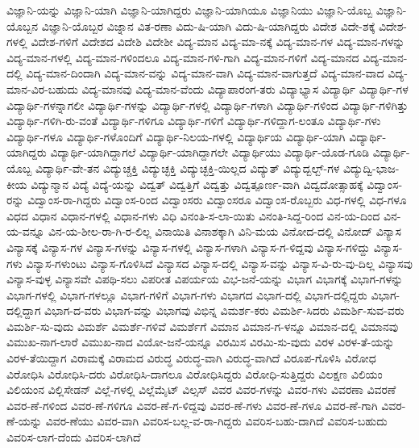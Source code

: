{ವಿಜ್ಞಾನಿ-ಯನ್ನು
ವಿಜ್ಞಾನಿ-ಯಾಗಿ
ವಿಜ್ಞಾನಿ-ಯಾಗಿದ್ದರು
ವಿಜ್ಞಾನಿ-ಯಾಗಿಯೂ
ವಿಜ್ಞಾನಿಯು
ವಿಜ್ಞಾನಿ-ಯೊಬ್ಬ
ವಿಜ್ಞಾನಿ-ಯೊಬ್ಬನ
ವಿಜ್ಞಾನಿ-ಯೊಬ್ಬರ
ವಿಜ್ನಾನ
ವಿತ-ರಣಾ
ವಿದು-ಷಿ-ಯಾಗಿ
ವಿದು-ಷಿ-ಯಾಗಿದ್ದರು
ವಿದೇಶ
ವಿದೇ-ಶಕ್ಕೆ
ವಿದೇಶ-ಗಳಲ್ಲಿ
ವಿದೇಶ-ಗಳಿಗೆ
ವಿದೇಶದ
ವಿದೇಶಿ
ವಿದೇಶೀ
ವಿದ್ಯ-ಮಾನ
ವಿದ್ಯ-ಮಾ-ನಕ್ಕೆ
ವಿದ್ಯ-ಮಾನ-ಗಳ
ವಿದ್ಯ-ಮಾನ-ಗಳನ್ನು
ವಿದ್ಯ-ಮಾನ-ಗಳಲ್ಲಿ
ವಿದ್ಯ-ಮಾನ-ಗಳಿಂದಲೂ
ವಿದ್ಯ-ಮಾನ-ಗಳಿ-ಗಾಗಿ
ವಿದ್ಯ-ಮಾನ-ಗಳಿಗೆ
ವಿದ್ಯ-ಮಾನದ
ವಿದ್ಯ-ಮಾನ-ದಲ್ಲಿ
ವಿದ್ಯ-ಮಾನ-ದಿಂದಾಗಿ
ವಿದ್ಯ-ಮಾನ-ವನ್ನು
ವಿದ್ಯ-ಮಾನ-ವಾಗಿ
ವಿದ್ಯ-ಮಾನ-ವಾಗುತ್ತದೆ
ವಿದ್ಯ-ಮಾನ-ವಾದ
ವಿದ್ಯ-ಮಾನ-ವಿರ-ಬಹುದು
ವಿದ್ಯ-ಮಾನವು
ವಿದ್ಯ-ಮಾನ-ವೆಂದು
ವಿದ್ಯಾಪಾರಂಗ-ತರು
ವಿದ್ಯಾಭ್ಯಾಸ
ವಿದ್ಯಾರ್ಥಿ
ವಿದ್ಯಾರ್ಥಿ-ಗಳ
ವಿದ್ಯಾರ್ಥಿ-ಗಳನ್ನಾಗಲೀ
ವಿದ್ಯಾರ್ಥಿ-ಗಳನ್ನು
ವಿದ್ಯಾರ್ಥಿ-ಗಳಲ್ಲಿ
ವಿದ್ಯಾರ್ಥಿ-ಗಳಾಗಿ
ವಿದ್ಯಾರ್ಥಿ-ಗಳಿಂದ
ವಿದ್ಯಾರ್ಥಿ-ಗಳಿಗಿತ್ತು
ವಿದ್ಯಾರ್ಥಿ-ಗಳಿಗಿ-ರು-ವಂತೆ
ವಿದ್ಯಾರ್ಥಿ-ಗಳಿಗೂ
ವಿದ್ಯಾರ್ಥಿ-ಗಳಿಗೆ
ವಿದ್ಯಾರ್ಥಿ-ಗಳಿದ್ದಾಗ-ಲಂತೂ
ವಿದ್ಯಾರ್ಥಿ-ಗಳು
ವಿದ್ಯಾರ್ಥಿ-ಗಳೂ
ವಿದ್ಯಾರ್ಥಿ-ಗಳೊಂದಿಗೆ
ವಿದ್ಯಾರ್ಥಿ-ನಿಲಯ-ಗಳಲ್ಲಿ
ವಿದ್ಯಾರ್ಥಿಯ
ವಿದ್ಯಾರ್ಥಿ-ಯಾಗಿ
ವಿದ್ಯಾರ್ಥಿ-ಯಾಗಿದ್ದರು
ವಿದ್ಯಾರ್ಥಿ-ಯಾಗಿದ್ದಾಗಲೆ
ವಿದ್ಯಾರ್ಥಿ-ಯಾಗಿದ್ದಾಗಲೇ
ವಿದ್ಯಾರ್ಥಿಯು
ವಿದ್ಯಾರ್ಥಿ-ಯೊಡ-ಗೂಡಿ
ವಿದ್ಯಾರ್ಥಿ-ಯೊಬ್ಬ
ವಿದ್ಯಾರ್ಥಿ-ವೇ-ತನ
ವಿದ್ಯುಚ್ಚಕ್ತಿ
ವಿದ್ಯುಚ್ಛಕ್ತಿ
ವಿದ್ಯುಚ್ಛಕ್ತಿ-ಯಿಲ್ಲದ
ವಿದ್ಯುತ್
ವಿದ್ಯುದ್ಬಲ್ಬ್-ಗಳ
ವಿದ್ಯುದ್ವಿ-ಭಾಜ-ಕೀಯ
ವಿದ್ಯುನ್ಮಾನ
ವಿದ್ಯೆ
ವಿದ್ಯೆ-ಯನ್ನು
ವಿದ್ವತ್
ವಿದ್ವತ್ತಿಗೆ
ವಿದ್ವತ್ತು
ವಿದ್ವತ್ಪೂರ್ಣ-ವಾಗಿ
ವಿದ್ವದೋತ್ಸಾಹಕ್ಕೆ
ವಿದ್ವಾಂಸ-ರನ್ನು
ವಿದ್ವಾಂಸ-ರಾ-ಗಿದ್ದರು
ವಿದ್ವಾಂಸ-ರಿಂದ
ವಿದ್ವಾಂಸರು
ವಿದ್ವಾಂಸರೂ
ವಿದ್ವಾಂಸ-ರೊಬ್ಬರು
ವಿಧ-ಗಳಲ್ಲಿ
ವಿಧ-ಗಳೂ
ವಿಧದ
ವಿಧಾನ
ವಿಧಾನ-ಗಳಲ್ಲಿ
ವಿಧಾನ-ಗಳು
ವಿಧಿ
ವಿನಂತಿ-ಸ-ಲಾ-ಯಿತು
ವಿನಂತಿ-ಸಿದ್ದ-ರಿಂದ
ವಿನ-ಯ-ದಿಂದ
ವಿನ-ಯ-ವನ್ನೂ
ವಿನ-ಯ-ಶೀಲ-ರಾ-ಗಿ-ರ-ಲಿಲ್ಲ
ವಿನಾಯಿತಿ
ವಿನಾಶಕ್ಕಾಗಿ
ವಿನಿ-ಮಯ
ವಿನೋದ-ದಲ್ಲಿ
ವಿನೋದ್
ವಿನ್ಯಾಸ
ವಿನ್ಯಾಸಕ್ಕೆ
ವಿನ್ಯಾಸ-ಗಳ
ವಿನ್ಯಾಸ-ಗಳನ್ನು
ವಿನ್ಯಾಸ-ಗಳಲ್ಲಿ
ವಿನ್ಯಾಸ-ಗಳಾಗಿ
ವಿನ್ಯಾಸ-ಗ-ಳಿದ್ದವು
ವಿನ್ಯಾಸ-ಗಳಿದ್ದು
ವಿನ್ಯಾಸ-ಗಳು
ವಿನ್ಯಾಸ-ಗಳುಂಟು
ವಿನ್ಯಾಸ-ಗೊಳಿಸಿದೆ
ವಿನ್ಯಾಸದ
ವಿನ್ಯಾಸ-ದಲ್ಲಿ
ವಿನ್ಯಾಸ-ವನ್ನು
ವಿನ್ಯಾಸ-ವಿ-ರು-ವು-ದಿಲ್ಲ
ವಿನ್ಯಾಸವು
ವಿನ್ಯಾಸ-ವುಳ್ಳ
ವಿನ್ಯಾಸವೇ
ವಿಪಥಿ-ಸಲು
ವಿಪರೀತ
ವಿಪರ್ಯಯ
ವಿಭ-ಜನೆ-ಯನ್ನು
ವಿಭಾಗ
ವಿಭಾಗಕ್ಕೆ
ವಿಭಾಗ-ಗಳನ್ನು
ವಿಭಾಗ-ಗಳಲ್ಲಿ
ವಿಭಾಗ-ಗಳಲ್ಲೂ
ವಿಭಾಗ-ಗಳಿಗೆ
ವಿಭಾಗ-ಗಳು
ವಿಭಾಗದ
ವಿಭಾಗ-ದಲ್ಲಿ
ವಿಭಾಗ-ದಲ್ಲಿದ್ದರು
ವಿಭಾಗ-ದಲ್ಲಿದ್ದಾಗ
ವಿಭಾಗ-ದ-ವರು
ವಿಭಾಗ-ವನ್ನು
ವಿಭಾಗವು
ವಿಭಿನ್ನ
ವಿಮರ್ಶ-ಕರು
ವಿಮರ್ಶಿ-ಸಿದರು
ವಿಮರ್ಶಿ-ಸುವ-ವರು
ವಿಮರ್ಶಿ-ಸು-ವುದು
ವಿಮರ್ಶೆ
ವಿಮರ್ಶೆ-ಗಳಿವೆ
ವಿಮರ್ಶೆಗೆ
ವಿಮಾನ
ವಿಮಾನ-ಗ-ಳನ್ನೂ
ವಿಮಾನ-ದಲ್ಲಿ
ವಿಮಾನವು
ವಿಮುಖ-ನಾಗ-ಲಾರೆ
ವಿಮುಖ-ನಾದ
ವಿಯೋ-ಜನೆ-ಯನ್ನೂ
ವಿರಮಿಸ
ವಿರಮಿ-ಸು-ವುದು
ವಿರಳ
ವಿರಳ-ತೆ-ಯನ್ನು
ವಿರಳ-ತೆಯಿದ್ದಾಗ
ವಿರಾಮಕ್ಕೆ
ವಿರಾಮದ
ವಿರುದ್ಧ
ವಿರುದ್ಧ-ವಾಗಿ
ವಿರುದ್ಧ-ವಾಗಿದೆ
ವಿರೂಪ-ಗೊಳಿಸಿ
ವಿರೋಧ
ವಿರೋಧಿಸಿ
ವಿರೋಧಿಸಿ-ದರು
ವಿರೋಧಿಸಿ-ದಾಗಲೂ
ವಿರೋಧಿಸಿದ್ದರು
ವಿರೋಧಿ-ಸುತ್ತಿದ್ದರು
ವಿಲಕ್ಷಣ
ವಿಲಿಯಂ
ವಿಲಿಯಂನ
ವಿಲ್ಲಿಸೇಡನ್
ವಿಲ್ಲೆ-ಗಳಲ್ಲಿ
ವಿಲ್ಲೆಮೈಟ್
ವಿಲ್ಸಸ್
ವಿವರ
ವಿವರ-ಗಳನ್ನು
ವಿವರ-ಗಳು
ವಿವರಣಾ
ವಿವರಣೆ
ವಿವರ-ಣೆ-ಗಳಿಂದ
ವಿವರ-ಣೆ-ಗಳಿಗೂ
ವಿವರ-ಣೆ-ಗ-ಳಿದ್ದವು
ವಿವರ-ಣೆ-ಗಳು
ವಿವರ-ಣೆ-ಗಳೂ
ವಿವರ-ಣೆ-ಗಾಗಿ
ವಿವರ-ಣೆ-ಯನ್ನು
ವಿವರ-ಣೆಯು
ವಿವರ-ವಾಗಿ
ವಿವರಿಸ-ಬಲ್ಲ-ವ-ರಾ-ಗಿದ್ದರು
ವಿವರಿಸ-ಬಹು-ದಾಗಿದೆ
ವಿವರಿಸ-ಬಹುದು
ವಿವರಿಸ-ಲಾಗ-ದೆಂದು
ವಿವರಿಸ-ಲಾಗಿದೆ
}
